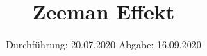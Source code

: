 

\subject{V 27}
\title{Zeeman Effekt}
\date{%
  Durchführung: 20.07.2020
  \hspace{3em}
  Abgabe: 16.09.2020
}



\maketitle
\thispagestyle{empty}
\tableofcontents
\newpage







\printbibliography{}


